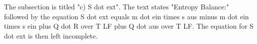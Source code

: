 The subsection is titled "c) S dot ext". The text states "Entropy Balance:" followed by the equation S dot ext equals m dot ein times s aus minus m dot ein times s ein plus Q dot R over T LF plus Q dot aus over T LF. The equation for S dot ext is then left incomplete.
